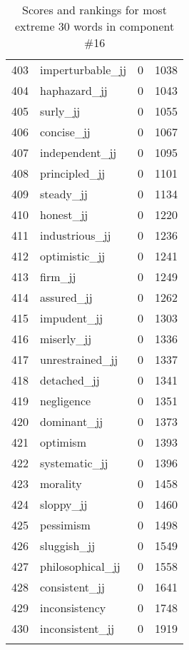 \begin{longtable}[!htbp]{| rlr@{.}l |}
    403 & imperturbable\_jj & 0 & 1038 \\
    404 & haphazard\_jj & 0 & 1043 \\
    405 & surly\_jj & 0 & 1055 \\
    406 & concise\_jj & 0 & 1067 \\
    407 & independent\_jj & 0 & 1095 \\
    408 & principled\_jj & 0 & 1101 \\
    409 & steady\_jj & 0 & 1134 \\
    410 & honest\_jj & 0 & 1220 \\
    411 & industrious\_jj & 0 & 1236 \\
    412 & optimistic\_jj & 0 & 1241 \\
    413 & firm\_jj & 0 & 1249 \\
    414 & assured\_jj & 0 & 1262 \\
    415 & impudent\_jj & 0 & 1303 \\
    416 & miserly\_jj & 0 & 1336 \\
    417 & unrestrained\_jj & 0 & 1337 \\
    418 & detached\_jj & 0 & 1341 \\
    419 & negligence & 0 & 1351 \\
    420 & dominant\_jj & 0 & 1373 \\
    421 & optimism & 0 & 1393 \\
    422 & systematic\_jj & 0 & 1396 \\
    423 & morality & 0 & 1458 \\
    424 & sloppy\_jj & 0 & 1460 \\
    425 & pessimism & 0 & 1498 \\
    426 & sluggish\_jj & 0 & 1549 \\
    427 & philosophical\_jj & 0 & 1558 \\
    428 & consistent\_jj & 0 & 1641 \\
    429 & inconsistency & 0 & 1748 \\
    430 & inconsistent\_jj & 0 & 1919 \\
    \hline
    \caption{Scores and rankings for most extreme 30 words in component \#16} \\
\end{longtable}
